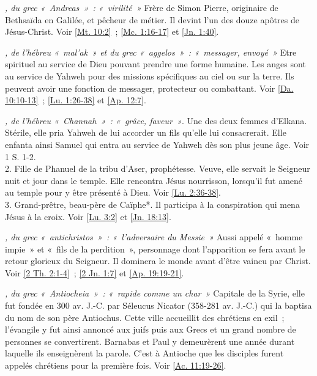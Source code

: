 \begin{multicols}{2}
\textit{, du grec «~Andreas~»~: «~virilité~»}\newline
Frère de Simon Pierre, originaire de Bethsaïda en Galilée, et pêcheur de métier. Il devint l'un des douze apôtres de Jésus-Christ. Voir \vref{Mt. 10:2}~; \vref{Mc. 1:16-17} et \vref{Jn. 1:40}.

\textit{, de l'hébreu «~mal'ak~» et du grec «~aggelos~»~: «~messager, envoyé~»}\newline
Etre spirituel au service de Dieu pouvant prendre une forme humaine. Les anges sont au service de Yahweh pour des missions spécifiques au ciel ou sur la terre. Ils peuvent avoir une fonction de messager, protecteur ou combattant.\newline
Voir \vref{Da. 10:10-13}~; \vref{Lu. 1:26-38} et \vref{Ap. 12:7}.

\textit{, de l'hébreu «~Channah~»~: «~grâce, faveur~»}. Une des deux femmes d'Elkana. Stérile, elle pria Yahweh de lui accorder un fils qu'elle lui consacrerait. Elle enfanta ainsi Samuel qui entra au service de Yahweh dès son plus jeune âge. Voir 1 S. 1-2.
\\2. Fille de Phanuel de la tribu d'Aser, prophétesse. Veuve, elle servait le Seigneur nuit et jour dans le temple. Elle rencontra Jésus nourrisson, lorsqu'il fut amené au temple pour y être présenté à Dieu. Voir \vref{Lu. 2:36-38}.
\\3. Grand-prêtre, beau-père de Caïphe*. Il participa à la conspiration qui mena Jésus à la croix.\newline
Voir \vref{Lu. 3:2} et \vref{Jn. 18:13}.

\textit{, du grec «~antichristos~»~: «~l'adversaire du Messie~»}\newline
Aussi appelé «~homme impie~» et «~fils de la perdition~», personnage dont l'apparition se fera avant le retour glorieux du Seigneur. Il dominera le monde avant d'être vaincu par Christ. Voir \vref{2 Th. 2:1-4}~; \vref{2 Jn. 1:7} et \vref{Ap. 19:19-21}.

\textit{, du grec «~Antiocheia~»~: «~rapide comme un char~»}\newline
Capitale de la Syrie, elle fut fondée en 300 av. J.-C. par Séleucus Nicator (358-281 av. J.-C.) qui la baptisa du nom de son père Antiochus. Cette ville accueillit des chrétiens en exil~; l'évangile y fut ainsi annoncé aux juifs puis aux Grecs et un grand nombre de personnes se convertirent. Barnabas et Paul y demeurèrent une année durant laquelle ils enseignèrent la parole. C'est à Antioche que les disciples furent appelés chrétiens pour la première fois.\newline
Voir \vref{Ac. 11:19-26}.


\end{multicols}

